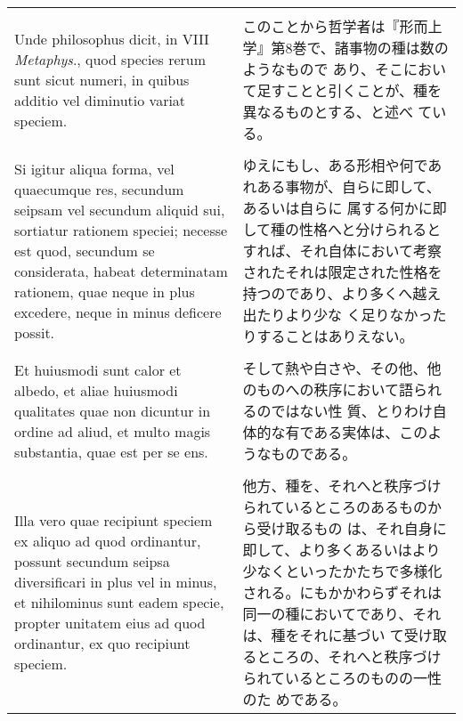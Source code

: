 \documentclass[10pt]{jsarticle} %
\begin{document}
\begin{longtable}{p{21em}p{21em}}
\\\\


Unde philosophus dicit, in VIII
{\itshape Metaphys}., quod species rerum sunt sicut numeri, in quibus additio vel
diminutio variat speciem. 


&

このことから哲学者は『形而上学』第8巻で、諸事物の種は数のようなもので
 あり、そこにおいて足すことと引くことが、種を異なるものとする、と述べ
 ている。

\\\\


Si igitur aliqua forma, vel quaecumque res,
secundum seipsam vel secundum aliquid sui, sortiatur rationem speciei;
necesse est quod, secundum se considerata, habeat determinatam
rationem, quae neque in plus excedere, neque in minus deficere
possit. 


&

ゆえにもし、ある形相や何であれある事物が、自らに即して、あるいは自らに
属する何かに即して種の性格へと分けられるとすれば、それ自体において考察
されたそれは限定された性格を持つのであり、より多くへ越え出たりより少な
く足りなかったりすることはありえない。

\\\\


Et huiusmodi sunt calor et albedo, et aliae huiusmodi
qualitates quae non dicuntur in ordine ad aliud, et multo magis
substantia, quae est per se ens. 


&

そして熱や白さや、その他、他のものへの秩序において語られるのではない性
質、とりわけ自体的な有である実体は、このようなものである。

\\\\


Illa vero quae recipiunt speciem ex
aliquo ad quod ordinantur, possunt secundum seipsa diversificari in
plus vel in minus, et nihilominus sunt eadem specie, propter unitatem
eius ad quod ordinantur, ex quo recipiunt speciem. 


&

他方、種を、それへと秩序づけられているところのあるものから受け取るもの
は、それ自身に即して、より多くあるいはより少なくといったかたちで多様化
される。にもかかわらずそれは同一の種においてであり、それは、種をそれに基づい
て受け取るところの、それへと秩序づけられているところのものの一性のた
めである。


\end{longtable}
\end{document}
